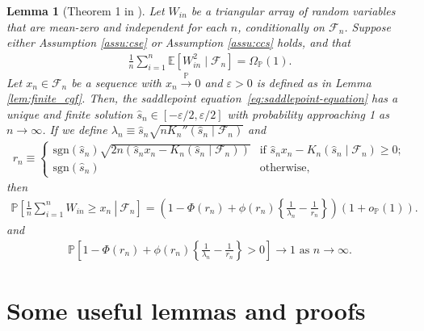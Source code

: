 \documentclass[12pt]{article}
\newtheorem{lemma}{Lemma}
\theoremstyle{definition}
\def\P{\mathbb{P}}
\def\sgn{\mathrm{sgn}}
\def\P{\mathbb{P}}
\newcommand{\E}{\mathbb E}								%
\renewcommand{\P}{\mathbb{P}}							%
\begin{document}
\begin{lemma}[Theorem 1 in \cite{Niu2024}]\label{cor:spa_conditional_inid}
	Let $W_{in}$ be a triangular array of random variables that are mean-zero and independent for each $n$, conditionally on $\mathcal F_n$. Suppose either Assumption \ref{assu:cse} or Assumption \ref{assu:ccs} holds, and that
	\begin{align}\label{eq:lower_bound_conditional_variance}
		\frac{1}{n}\sum_{i=1}^n \E[W_{in}^2 \mid \mathcal{F}_n]=\Omega_{\P}(1).
	\end{align}
	Let $x_n \in \mathcal F_n$ be a sequence with $x_n \overset{\P} \rightarrow 0$ and $\varepsilon>0$ is defined as in Lemma \ref{lem:finite_cgf}. Then, the saddlepoint equation~\eqref{eq:saddlepoint-equation} has a unique and finite solution $\hat s_n \in [-\varepsilon/2, \varepsilon/2]$ with probability approaching 1 as $n \rightarrow \infty$. If we define $\lambda_n \equiv \hat s_n\sqrt{nK_n''(\hat s_n\mid\mathcal{F}_n)}$ and
	  \begin{align*}
		r_n \equiv
		\begin{cases}
		  \sgn(\hat s_n) \sqrt{2n( \hat s_n x_n - K_n(\hat s_n\mid\mathcal{F}_n))} & \text{if } \hat s_n x_n - K_n(\hat s_n\mid\mathcal{F}_n)\geq 0;\\
		  \mathrm{sgn}(\hat s_n) & \text{otherwise},
		\end{cases}
		\end{align*}
	  then
	  \begin{align*}
		\P\left[\left.\frac{1}{n}\sum_{i = 1}^n W_{in} \geq x_n\ \right|\ \mathcal{F}_n\right]=\left(1-\Phi(r_n)+\phi(r_n)\left\{\frac{1}{\lambda_n}-\frac{1}{r_n}\right\}\right)(1+o_{\P}(1)).
	  \end{align*}
    and 
    \begin{align*}
      \P\left[1-\Phi(r_n)+\phi(r_n)\left\{\frac{1}{\lambda_n}-\frac{1}{r_n}\right\}>0\right]\rightarrow1 \text{ as }n\rightarrow\infty.
    \end{align*}
  \end{lemma}



\section{Some useful lemmas and proofs}\label{sec:useful_lemma}
\end{document}
